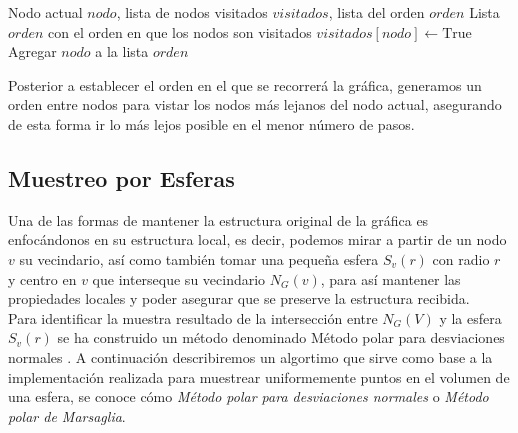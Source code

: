 \begin{algorithm}[H]
\caption{DFS Order}
\label{alg:DFS}
\begin{algorithmic}[1]
\Require Nodo actual $nodo$, lista de nodos visitados $visitados$, lista del orden $orden$
\Ensure Lista $orden$ con el orden en que los nodos son visitados
\Statex
{}
    \State $visitados[nodo] \gets \text{True}$
    \State Agregar $nodo$ a la lista $orden$
            \State {}
        \EndIf
    \EndFor
\EndFunction
\end{algorithmic}
\end{algorithm}

Posterior a establecer el orden en el que se recorrerá la gráfica, generamos un orden entre nodos para vistar los nodos más lejanos del nodo actual, asegurando de esta forma ir lo más lejos posible en el menor número de pasos.

\subsection{Muestreo por Esferas}
Una de las formas de mantener la estructura original de la gráfica es enfocándonos en su estructura local, es decir, podemos mirar a partir de un nodo  $v$ su vecindario, así como también tomar una pequeña esfera $S_v(r)$ con radio $r$ y centro en $v$ que interseque su vecindario $N_G(v)$, para así mantener las propiedades locales y poder asegurar que se preserve la estructura recibida.
\\ Para identificar la muestra resultado de la intersección entre $N_G(V)$ y la esfera $S_v(r)$ se ha construido un método denominado Método polar para desviaciones normales \cite[p.~122-123]{Knuth}.
A continuación describiremos un algortimo que sirve como base a la implementación realizada para muestrear uniformemente puntos en el volumen de una esfera, se conoce cómo \textit{Método polar para desviaciones normales} o \textit{Método polar de Marsaglia}.

